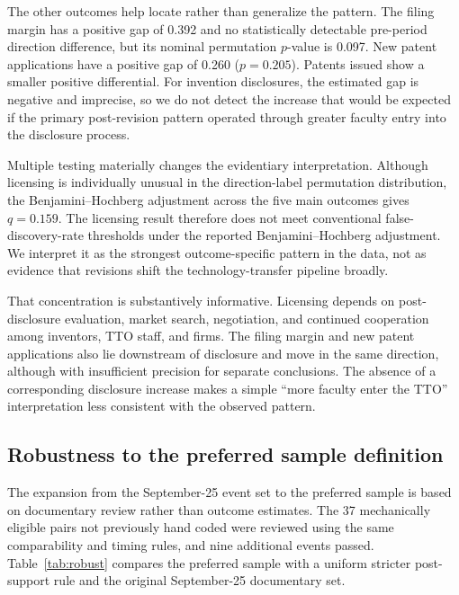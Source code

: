 The other outcomes help locate rather than generalize the pattern. The filing margin has a positive gap of 0.392 and no statistically detectable pre-period direction difference, but its nominal permutation $p$-value is 0.097. New patent applications have a positive gap of 0.260 ($p=0.205$). Patents issued show a smaller positive differential. For invention disclosures, the estimated gap is negative and imprecise, so we do not detect the increase that would be expected if the primary post-revision pattern operated through greater faculty entry into the disclosure process.

Multiple testing materially changes the evidentiary interpretation. Although licensing is individually unusual in the direction-label permutation distribution, the Benjamini--Hochberg adjustment across the five main outcomes gives $q=0.159$. The licensing result therefore does not meet conventional false-discovery-rate thresholds under the reported Benjamini--Hochberg adjustment. We interpret it as the strongest outcome-specific pattern in the data, not as evidence that revisions shift the technology-transfer pipeline broadly.

That concentration is substantively informative. Licensing depends on post-disclosure evaluation, market search, negotiation, and continued cooperation among inventors, TTO staff, and firms. The filing margin and new patent applications also lie downstream of disclosure and move in the same direction, although with insufficient precision for separate conclusions. The absence of a corresponding disclosure increase makes a simple ``more faculty enter the TTO'' interpretation less consistent with the observed pattern.

\subsection*{Robustness to the preferred sample definition}

The expansion from the September-25 event set to the preferred sample is based on documentary review rather than outcome estimates. The 37 mechanically eligible pairs not previously hand coded were reviewed using the same comparability and timing rules, and nine additional events passed. Table~\ref{tab:robust} compares the preferred sample with a uniform stricter post-support rule and the original September-25 documentary set.

